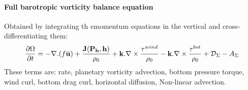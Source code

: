 \documentclass[..\Papers.tex]{subfiles}
\begin{document}
\paragraph{Full barotropic vorticity balance equation}
Obtained by integrating th emomentum equations in the vertical and cross-differentiating them:
\begin{equation}
    \frac{\partial \Omega}{\partial t} = - \nabla . (f\bar{\bf{u}}) + \frac{\bf{J}(P_b,h)}{\rho_0} + {\bf{k}}.\nabla\times\frac{\tau^{wind}}{\rho_0}-{\bf{k}}.\nabla\times\frac{\tau^{bot}}{\rho_0}+\mathcal{D}_\Sigma-A_\Sigma
\end{equation}
These terms are: rate, planetary vorticity advection, bottom pressure torque, wind curl, bottom drag curl, horizontal diffusion, Non-linear advection.
\end{document}
